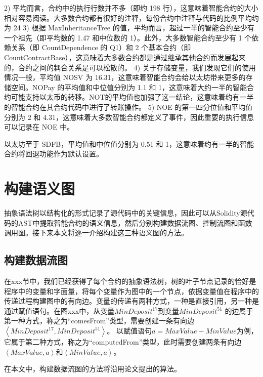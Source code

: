 2) 平均而言，合约中的执行行数并不多（即约 198 行），这意味着智能合约的大小相对容易阅读。大多数合约都有很好的注释，每份合约中注释与代码的比例平均约为 24%
3) 根据 MaxInheritanceTree 的值，平均而言，超过一半的智能合约至少有一个祖先（即平均数的 1.47 和中位数的 1）。此外，大多数智能合约至少有 1 个依赖关系（即 CountDependence 的 Q1）和 2 个基本合约（即 CountContractBase），这意味着大多数合约都是通过继承其他合约而发展起来的，合约之间的耦合关系是可以松散的。
4) 关于存储变量，我们发现它们的使用情况一般，平均值 NOSV 为 16.31，这意味着智能合约会给以太坊带来更多的存储空间。NOPay 的平均值和中位值分别为 1.1 和 1，这意味着大约一半的智能合约可能支持以太币的转移。NOT的平均值也加强了这一结论，这意味着约有一半的智能合约在其合约代码中进行了转账操作。
5) NOE 的第一四分位值和平均值分别为 2 和 4.31，这意味着大多数智能合约都定义了事件，因此重要的执行信息可以记录在 NOE 中。


以太坊至于 SDFB，平均值和中位值分别为 0.51 和 1，这意味着约有一半的智能合约将回退功能作为默认设置。
\section{构建语义图}
\label{sec:构建语义图}
抽象语法树以结构化的形式记录了源代码中的关键信息，因此可以从Solidity源代码的AST中提取智能合约的语义信息，然后分别构建数据流图、控制流图和函数调用图。接下来本文将逐一介绍构建这三种语义图的方法。
\subsection{构建数据流图}
\label{sec:构建数据流图}
在xxx节中，我们已经获得了每个合约的抽象语法树，树的叶子节点记录的恰好是程序中的变量和字面量，将每个变量作为图中的一个节点，依据变量值在程序中的传递过程构建图中的有向边。变量的传递有两种方式，一种是直接引用，另一种是通过赋值语句。在图xxx中，从变量$MinDeposit^{17}$到变量$MinDeposit^{51}$ 的边属于第一种方式，称之为“comesFrom”类型，需要创建一条有向边$\left\langle MinDeposit^{17}, MinDeposit^{51}\right\rangle$。
以赋值语句$a=MaxValue-MinValue$为例，它属于第二种方式，称之为“computedFrom”类型，此时需要创建两条有向边$\left\langle MaxValue,a\right\rangle$和$\left\langle MinValue,a\right\rangle$。

在本文中，构建数据流图的方法将沿用论文\cite{wu2021peculiar}提出的算法。
